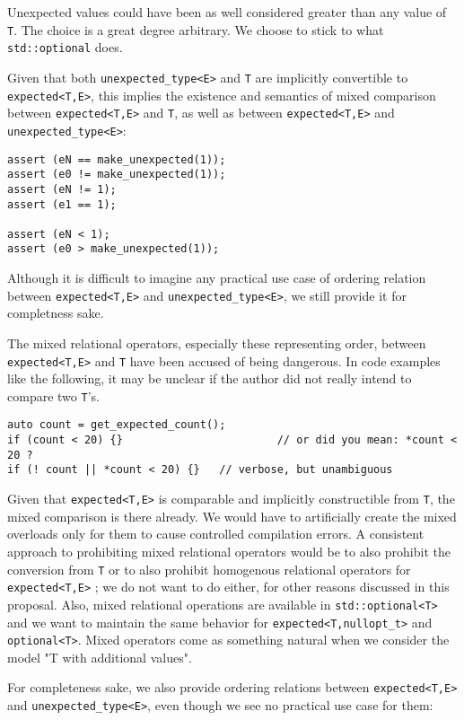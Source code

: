 \documentclass[a4paper,10pt]{article}
\newcommand{\cpp}[1]{\lstinline{#1}}
\begin{document}
Unexpected values could have been as well considered greater than any value of \cpp{T}. The choice is a great degree arbitrary. We choose to stick to what \cpp{std::optional} does.

Given that both \cpp{unexpected_type<E>} and \cpp{T} are implicitly convertible to \cpp{expected<T,E>}, this implies the existence and semantics of mixed comparison between \cpp{expected<T,E>} and \cpp{T}, as well as between \cpp{expected<T,E>} and \cpp{unexpected_type<E>}:

\begin{lstlisting}
assert (eN == make_unexpected(1));
assert (e0 != make_unexpected(1));
assert (eN != 1);
assert (e1 == 1);

assert (eN < 1);
assert (e0 > make_unexpected(1));
\end{lstlisting}

Although it is difficult to imagine any practical use case of ordering relation between \cpp{expected<T,E>} and \cpp{unexpected_type<E>}, we still provide it for completness sake.

The mixed relational operators, especially these representing order, between \cpp{expected<T,E>} and \cpp{T} have been accused of being dangerous. In code examples like the following, it may be unclear if the author did not really intend to compare two \cpp{T}'s.

\begin{lstlisting}
auto count = get_expected_count();
if (count < 20) {}                        // or did you mean: *count < 20 ?
if (! count || *count < 20) {}   // verbose, but unambiguous
\end{lstlisting}

Given that \cpp{expected<T,E>} is comparable and implicitly constructible from \cpp{T}, the mixed comparison is there already. We would have to artificially create the mixed overloads only for them to cause controlled compilation errors. A consistent approach to prohibiting mixed relational operators would be to also prohibit the conversion from \cpp{T} or to also prohibit homogenous relational operators for \cpp{expected<T,E>} ; we do not want to do either, for other reasons discussed in this proposal. Also, mixed relational operations are available in \cpp{std::optional<T>} and we want to maintain the same behavior for \cpp{expected<T,nullopt_t>} and \cpp{optional<T>}. Mixed operators come as something natural when we consider the model "T with additional values".

For completeness sake, we also provide ordering relations between  \cpp{expected<T,E>} and  \cpp{unexpected_type<E>}, even though we see no practical use case for them:
\end{document}

